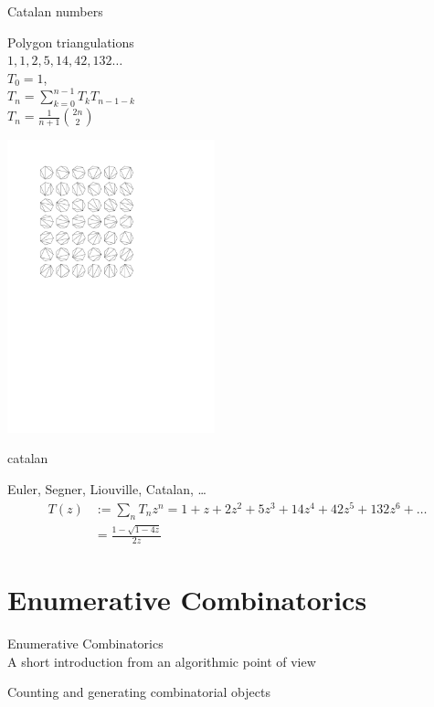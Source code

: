 \documentclass[compress,11pt]{beamer}
\begin{document}
\begin{frame}{Catalan numbers}

  \parbox{4cm}{
    \begin{center}
      Polygon triangulations\\[5mm]

      $1,1,2,5,14,42,132\dots$\\[3mm]
      $T_0=1$,\\[2mm]

      $\displaystyle T_n=\sum_{k=0}^{n-1}T_kT_{n-1-k}$\\[3mm]

      $\displaystyle T_n=\frac{1}{n+1}\binom{2n}{2}$
    \end{center}
  }\quad
  \includegraphics[align=c, trim=3cm 15cm 8cm 2.4cm, clip,
  width=6cm]{triangle.pdf}
\end{frame}

\begin{frame}{catalan}

  Euler, Segner, Liouville, Catalan, \dots
  \begin{equation*}
  \begin{split}
    T(z) &:= \sum_n T_n z^n = 1 + z +2 z^2 +5 z^3 + 14 z^4 + 42 z^5 + 132 z^6 +
    \dots \\
    &= \frac{1 - \sqrt{1-4z}}{2z}
  \end{split}
\end{equation*}
\end{frame}

\section{Enumerative Combinatorics}

\begin{frame}{Enumerative Combinatorics \\
    A short introduction from an algorithmic point of view}

  \Large
  \begin{tcolorbox}
    Counting and generating combinatorial objects
  \end{tcolorbox}
\end{frame}
\end{document}
